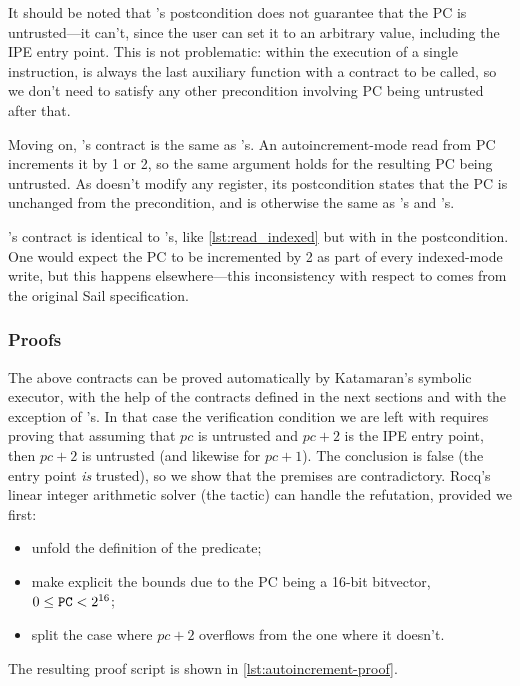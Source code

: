 It should be noted that 's postcondition does not guarantee that the PC is untrusted---it can't, since the user can set it to an arbitrary value, including the IPE entry point. This is not problematic: within the execution of a single instruction,  is always the last auxiliary function with a contract to be called, so we don't need to satisfy any other precondition involving PC being untrusted after that.

Moving on, 's contract is the same as 's. An auto\-increment-\-mode read from PC increments it by 1 or 2, so the same argument holds for the resulting PC being untrusted. As  doesn't modify any register, its postcondition states that the PC is unchanged from the precondition, and is otherwise the same as 's and 's.

's contract is identical to 's, \ie like \cref{lst:read_indexed} but with  in the postcondition. One would expect the PC to be incremented by 2 as part of every indexed-mode write, but this happens elsewhere---this inconsistency with respect to  comes from the original Sail specification.

\vspace{3.5\baselineskip}

\subsubsection{Proofs}
\label{sec:read-autoincrement-proof}

The above contracts can be proved automatically by Katamaran's symbolic executor, with the help of the contracts defined in the next sections and with the exception of 's. In that case the verification condition we are left with requires proving that assuming that \(\mathit{pc}\) is untrusted and \(\mathit{pc} + 2\) is the IPE entry point, then \(\mathit{pc} + 2\) is untrusted (and likewise for \(\mathit{pc} + 1\)). The conclusion is false (the entry point \emph{is} trusted), so we show that the premises are contradictory. Rocq's linear integer arithmetic solver (the  tactic) can handle the refutation, provided we first:
\begin{itemize}
\item unfold the definition of the  predicate;
\item make explicit the bounds due to the PC being a 16-bit bitvector, \ie \(0 \leq \reg{PC} < 2^{16}\);
\item split the case where \(\mathit{pc} + 2\) overflows from the one where it doesn't.
\end{itemize}
The resulting proof script is shown in \cref{lst:autoincrement-proof}.

